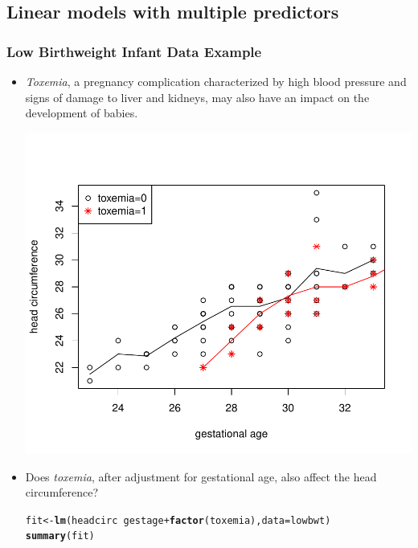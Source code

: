\documentclass{article}\usepackage[]{graphicx}\usepackage[svgnames]{xcolor}
\makeatletter
\def\maxwidth{ %
  \ifdim\Gin@nat@width>\linewidth
    \linewidth
  \else
    \Gin@nat@width
  \fi
}
\newcommand{\hlopt}[1]{\textcolor[rgb]{0,0,0}{#1}}%
\newcommand{\hlstd}[1]{\textcolor[rgb]{0.345,0.345,0.345}{#1}}%
\newcommand{\hlkwb}[1]{\textcolor[rgb]{0.69,0.353,0.396}{#1}}%
\newcommand{\hlkwc}[1]{\textcolor[rgb]{0.333,0.667,0.333}{#1}}%
\newcommand{\hlkwd}[1]{\textcolor[rgb]{0.737,0.353,0.396}{\textbf{#1}}}%
\newenvironment{kframe}{%
 \def\at@end@of@kframe{}%
 \ifinner\ifhmode%
  \def\at@end@of@kframe{\end{minipage}}%
  \begin{minipage}{\columnwidth}%
 \fi\fi%
 \def\FrameCommand##1{\hskip\@totalleftmargin \hskip-\fboxsep
 \colorbox{shadecolor}{##1}\hskip-\fboxsep
     \hskip-\linewidth \hskip-\@totalleftmargin \hskip\columnwidth}%
 \MakeFramed {\advance\hsize-\width
   \@totalleftmargin\z@ \linewidth\hsize
   \@setminipage}}%
 {\par\unskip\endMakeFramed%
 \at@end@of@kframe}
\newenvironment{knitrout}{}{} %
\makeatother
\begin{document}
\subsection*{Linear models with multiple predictors}
\subsubsection*{Low Birthweight Infant Data Example}
\begin{itemize}
      \item \emph{Toxemia}, a pregnancy complication characterized by high blood pressure
            and signs of damage to liver and kidneys, may also have an impact on the
            development of babies.
\begin{knitrout}
\color{fgcolor}

{\centering \includegraphics[width=\maxwidth]{figure/unnamed-chunk-15-1} 

}


\end{knitrout}
      \item Does \emph{toxemia}, after adjustment for gestational age, also affect the head
            circumference?
\begin{knitrout}
\color{fgcolor}\begin{kframe}
\begin{alltt}
\hlstd{fit} \hlkwb{<-} \hlkwd{lm}\hlstd{(headcirc} \hlopt{~} \hlstd{gestage} \hlopt{+} \hlkwd{factor}\hlstd{(toxemia),} \hlkwc{data} \hlstd{= lowbwt)}
\hlkwd{summary}\hlstd{(fit)}
\end{alltt}
\begin{verbatim}


\end{verbatim}
\end{kframe}
\end{knitrout}
\end{itemize}
\end{document}
